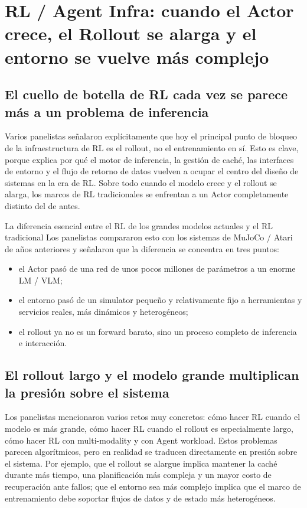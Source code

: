 \section{RL / Agent Infra: cuando el Actor crece, el Rollout se alarga y el entorno se vuelve más complejo}

\subsection{El cuello de botella de RL cada vez se parece más a un problema de inferencia}
Varios panelistas señalaron explícitamente que hoy el principal punto de bloqueo de la infraestructura de RL es el rollout, no el entrenamiento en sí. Esto es clave, porque explica por qué el motor de inferencia, la gestión de caché, las interfaces de entorno y el flujo de retorno de datos vuelven a ocupar el centro del diseño de sistemas en la era de RL. Sobre todo cuando el modelo crece y el rollout se alarga, los marcos de RL tradicionales se enfrentan a un Actor completamente distinto del de antes.

\begin{importantbox}{La diferencia esencial entre el RL de los grandes modelos actuales y el RL tradicional}
Los panelistas compararon esto con los sistemas de MuJoCo / Atari de años anteriores y señalaron que la diferencia se concentra en tres puntos:
\begin{itemize}
  \item el Actor pasó de una red de unos pocos millones de parámetros a un enorme LM / VLM;
  \item el entorno pasó de un simulator pequeño y relativamente fijo a herramientas y servicios reales, más dinámicos y heterogéneos;
  \item el rollout ya no es un forward barato, sino un proceso completo de inferencia e interacción.
\end{itemize}
\end{importantbox}

\subsection{El rollout largo y el modelo grande multiplican la presión sobre el sistema}
Los panelistas mencionaron varios retos muy concretos: cómo hacer RL cuando el modelo es más grande, cómo hacer RL cuando el rollout es especialmente largo, cómo hacer RL con multi-modality y con Agent workload. Estos problemas parecen algorítmicos, pero en realidad se traducen directamente en presión sobre el sistema. Por ejemplo, que el rollout se alargue implica mantener la caché durante más tiempo, una planificación más compleja y un mayor costo de recuperación ante fallos; que el entorno sea más complejo implica que el marco de entrenamiento debe soportar flujos de datos y de estado más heterogéneos.

